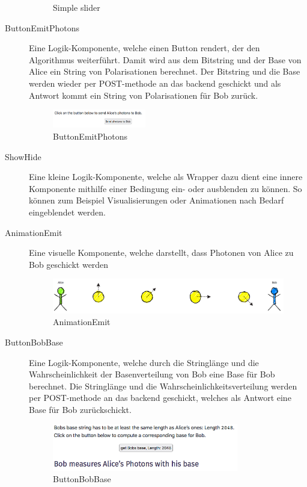 \documentclass[a4paper,10.2pt,pdftex]{scrartcl}%
\begin{document}
\begin{description}
\begin{figure}[h]
	\caption{Simple slider}
\end{figure}
\item[ButtonEmitPhotons] Eine Logik-Komponente, welche einen Button rendert, der den Algorithmus weiterführt. Damit wird aus dem Bitstring und der Base von Alice ein String von Polarisationen berechnet. Der Bitstring und die Base werden wieder per POST-methode an das backend geschickt und als Antwort kommt ein String von Polarisationen für Bob zurück.
\begin{figure}[h]
	\centering
  \includegraphics[width=0.4\textwidth]{graphics/component_button_emit_photons.png}
	\caption{ButtonEmitPhotons}
\end{figure}
\item[ShowHide] Eine kleine Logik-Komponente, welche als Wrapper dazu dient eine innere Komponente mithilfe einer Bedingung ein- oder ausblenden zu können. So können zum Beispiel Visualisierungen oder Animationen nach Bedarf eingeblendet werden.
\item[AnimationEmit] Eine visuelle Komponente, welche darstellt, dass Photonen von Alice zu Bob geschickt werden
\begin{figure}[h]
	\centering
  \includegraphics[width=\textwidth]{graphics/component_animation_emit.png}
	\caption{AnimationEmit}
\end{figure}
\item[ButtonBobBase] Eine Logik-Komponente, welche durch die Stringlänge und die Wahrscheinlichkeit der Basenverteilung von Bob eine Base für Bob berechnet. Die Stringlänge und die Wahrscheinlichkeitsverteilung werden per POST-methode an das backend geschickt, welches als Antwort eine Base für Bob zurückschickt. 
\begin{figure}[h]
	\centering
  \includegraphics[width=0.8\textwidth]{graphics/component_button_bob_base.png}
	\caption{ButtonBobBase}
\end{figure}
\end{description}
\newpage
\end{document}
